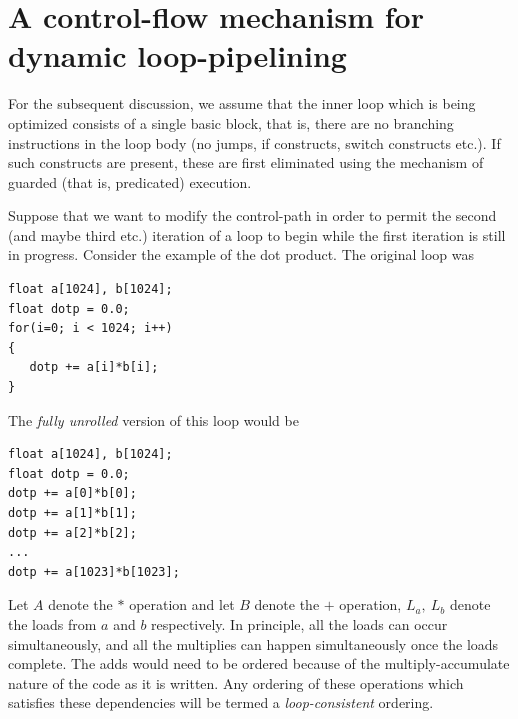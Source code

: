 \documentclass[conference]{IEEEtran}
\begin{document}
\section{A control-flow mechanism for dynamic loop-pipelining}

For the subsequent discussion, we assume that the inner
loop which is being optimized consists of a single
basic block, that is, there are no branching instructions
in the loop body (no jumps, if constructs, switch constructs etc.).
If such constructs are present, these are first eliminated
using the mechanism of guarded (that is, predicated) execution.

Suppose that we want to modify the control-path in order to
permit the second (and maybe third etc.) iteration of a loop
to begin while the first iteration is still in progress.  
Consider the example of the dot product.  The original
loop was
\begin{verbatim}
float a[1024], b[1024];
float dotp = 0.0;
for(i=0; i < 1024; i++)
{
   dotp += a[i]*b[i];
}
\end{verbatim}
The {\em fully unrolled} version of this loop would be
\begin{verbatim}
float a[1024], b[1024];
float dotp = 0.0;
dotp += a[0]*b[0];
dotp += a[1]*b[1];
dotp += a[2]*b[2];
...
dotp += a[1023]*b[1023];
\end{verbatim}
Let $A$ denote the $*$ operation and let $B$ denote the $+$
operation, $L_a,\ L_b$ denote the loads from $a$ and $b$ respectively.  
In principle, all the loads can occur simultaneously, and all the multiplies
can happen simultaneously once the loads complete.  The adds
would need to be ordered because of the multiply-accumulate nature
of the code as it is written.  Any ordering of these operations which
satisfies these dependencies will be termed a {\em loop-consistent}
ordering.
\end{document}
